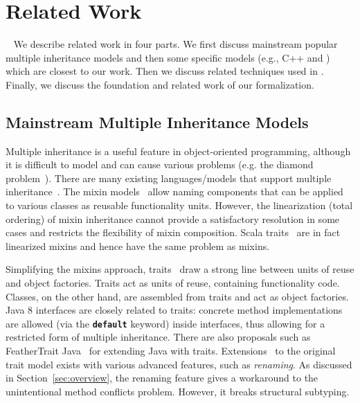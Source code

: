 \section{Related Work}~\label{sec:relatedwork}
We describe related work in four parts. We first discuss mainstream popular multiple 
inheritance models and then some specific models (e.g., C++ and \csharp) which are closest to our work. Then we 
discuss related techniques used in \self. Finally, we discuss the foundation and related work of our formalization.

\subsection{Mainstream Multiple Inheritance Models}
Multiple inheritance is a useful feature in object-oriented
programming, although it is difficult to model and can 
cause various problems (e.g. the diamond problem~\cite{Sak89dis,Singh1995}).  
There are many existing languages/models that support multiple 
inheritance~\cite{ellis1990annotated,scala-overview,bracha90mixin,scharli03traits,malayeri2009cz,csharpdoc,Moon1986,Flatt1998,Ancona2003}. 
The mixin models~\cite{bracha90mixin,Flatt1998,van1996encapsulation,Ancona2003,Hendler86} allow naming components 
that can be applied to various classes as reusable functionality units. However, the linearization (total ordering) of mixin 
inheritance cannot provide a satisfactory resolution in some cases and restricts the flexibility of mixin composition. 
Scala traits~\cite{scala-overview} are in fact linearized mixins and hence have the same problem as mixins.

Simplifying the mixins approach, traits~\cite{scharli03traits,Ducasse:2006:TMF:1119479.1119483} draw a
strong line between units of reuse and object factories. Traits act
as units of reuse, containing functionality code. Classes, on the
other hand, are
assembled from traits and act as object factories. Java 8
interfaces are closely related to traits: concrete method
implementations are allowed (via the \textbf{\texttt{default}}
keyword) inside interfaces, thus allowing for a restricted form 
of multiple inheritance.
There are also proposals such as FeatherTrait Java~\cite{Liquori08ftj} 
for extending Java with traits. Extensions~\cite{reppy2006foundation,Reppy:2007:MT:2394758.2394784} to 
the original trait model exists with various advanced features, such as \emph{renaming}. As discussed in Section~\ref{sec:overview},
the renaming feature gives a workaround to the unintentional method conflicts
problem. However, it breaks structural subtyping.

